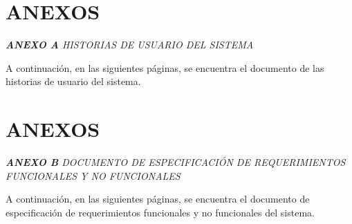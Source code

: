 \documentclass[spanish]{ieee_upb}
\begin{document}
\newpage
\renewcommand\refname{REFERENCIAS}



\newpage


\appendix
\section{ANEXOS}
\raggedright\textit{\textbf{ANEXO A} HISTORIAS DE USUARIO DEL SISTEMA}
\label{anexos:historias}

A continuación, en las siguientes páginas, se encuentra el documento de las historias de usuario del sistema. 





\newpage

\section{ANEXOS}
\raggedright\textit{\textbf{ANEXO B} DOCUMENTO DE ESPECIFICACIÓN DE REQUERIMIENTOS FUNCIONALES Y NO FUNCIONALES}
\label{anexos:requerimientos}

A continuación, en las siguientes páginas, se encuentra el documento de especificación de requerimientos funcionales y no funcionales del sistema.


\end{document}
